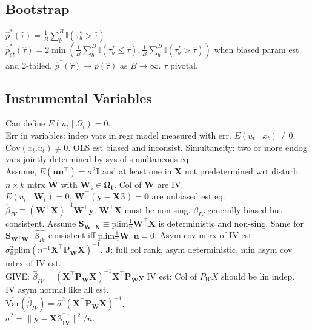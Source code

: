 \subsection*{Bootstrap}
$\hat{p}^{\ast}(\hat{\tau}) = \frac{1}{B} \sum_{b}^{B} \mathbb{I}(\tau_{b}^{\ast} > \hat{\tau})$\\
$\hat{p}^{\ast}_{et}(\hat{\tau}) = 2 \min \left( \frac{1}{B} \sum_{b}^{B} \mathbb{I} (\tau_{b}^{\ast} \leq \hat{\tau}), \frac{1}{B} \sum_{b}^{B} \mathbb{I} (\tau_{b}^{\ast} > \hat{\tau}) \right)$ when biased param est and 2-tailed.
$\hat{p}^{\ast}(\hat{\tau}) \rightarrow p(\hat{\tau})$ as $B \rightarrow \infty$. $\tau$ pivotal.
\subsection*{Instrumental Variables}
Can define $E(u_t \mid \Omega_t) = 0$.\\
Err in variables: indep vars in regr model measured with err.
$E(u_t \mid x_t) \neq 0$, $\text{Cov}(x_t. u_t) \neq 0$.
OLS est biased and inconsist.
Simultaneity: two or more endog vars jointly determined by sys of simultaneous eq.\\
Assume, $E(\mathbf{uu^{\top}}) = \sigma^2 \mathbf{I}$ and at least one in $\mathbf{X}$ not predetermined wrt disturb.
$n \times k$ mtrx $\mathbf{W}$ with $\mathbf{W_t \in \Omega_t}$.
Col of $\mathbf{W}$ are IV.\\
$E(u_t \mid \mathbf{W}_t) = 0$, $\mathbf{W}^{\top}(\mathbf{y - X\beta}) = \mathbf{0}$ are unbiased est eq.
$\hat{\beta}_{IV} \equiv (\mathbf{W^{\top}X})^{-1}\mathbf{W}^{\top}\mathbf{y}$.
$\mathbf{W^{\top}X}$ must be non-sing.
$\hat{\beta}_{IV}$ generally biased but consistent.
Assume $\mathbf{S_{W^{\top}X}} \equiv \text{plim} \frac{1}{n}\mathbf{W^{\top} X}$ is deterministic and non-sing.
Same for $\mathbf{S_{W^{\top}W}}$.
$\hat{\beta_{IV}}$ consistent iff $\text{plim} \frac{1}{n} \mathbf{W^{^\top}u} = 0$.
Asym cov mtrx of IV est: $\sigma_{0}^{2} \text{plim}(n^{-1}\mathbf{X^{\top}P_W X})^{-1}$.
$\mathbf{J}$: full col rank, asym deterministic, min asym cov mtrx of IV est.\\
GIVE: $\hat{\beta}_{IV} = (\mathbf{X^{\top}P_W X})^{-1} \mathbf{X^{\top} P_W y}$
IV est: Col of $P_W X$ should be lin indep.\\
IV asym normal like all est.\\
$\widehat{\text{Var}}(\hat{\beta}_{IV}) = \hat{\sigma}^2 (\mathbf{X^{\top}P_W X})^{-1}$.\\
$\hat{\sigma}^2 = \lVert \mathbf{y - X \hat{\beta_{IV}}} \rVert ^{2} / n$.
